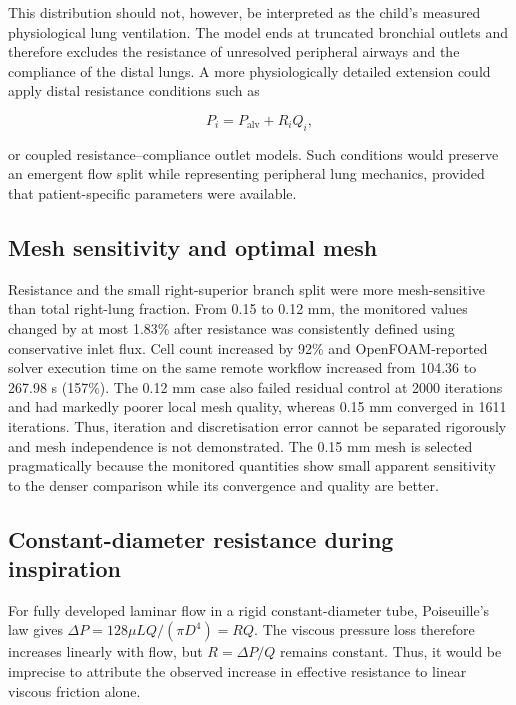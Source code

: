 \documentclass[11pt,a4paper]{article}
\begin{document}
This distribution should not, however, be interpreted as the child's measured
physiological lung ventilation. The model ends at truncated bronchial outlets and
therefore excludes the resistance of unresolved peripheral airways and the
compliance of the distal lungs. A more physiologically detailed extension could
apply distal resistance conditions such as

\begin{equation}
  P_i = P_{\mathrm{alv}} + R_i Q_i,
\end{equation}

or coupled resistance--compliance outlet models. Such conditions would preserve
an emergent flow split while representing peripheral lung mechanics, provided
that patient-specific parameters were available.

\subsection{Mesh sensitivity and optimal mesh}

Resistance and the small right-superior branch split were more mesh-sensitive
than total right-lung fraction. From 0.15 to 0.12 mm, the monitored values changed
by at most 1.83\% after resistance was consistently defined using conservative
inlet flux. Cell count increased by 92\% and OpenFOAM-reported solver execution
time on the same remote workflow increased from 104.36 to 267.98 s (157\%). The
0.12 mm case also failed residual control at 2000 iterations and had markedly
poorer local mesh quality, whereas 0.15 mm converged in 1611 iterations. Thus,
iteration and discretisation error cannot be separated rigorously and mesh
independence is not demonstrated. The 0.15 mm mesh is selected pragmatically
because the monitored quantities show small apparent sensitivity to the denser
comparison while its convergence and quality are better.

\subsection{Constant-diameter resistance during inspiration}

For fully developed laminar flow in a rigid constant-diameter tube,
Poiseuille's law gives $\Delta P=128\mu LQ/(\pi D^4)=RQ$. The viscous pressure
loss therefore increases linearly with flow, but $R=\Delta P/Q$ remains constant.
Thus, it would be imprecise to attribute the observed increase in effective
resistance to linear viscous friction alone.
\end{document}
